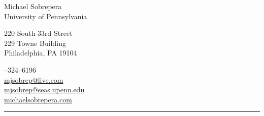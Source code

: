 \begin{center}
    {\LARGE Michael Sobrepera}\\[.5cm]
    University of Pennsylvania\\
    \begin{minipage}[c]{.35\textwidth}
    220 South 33rd Street\\
    229 Towne Building\\
    Philadelphia, PA 19104\\[.2cm]
    \end{minipage}
    \hspace{.28\textwidth}
    \begin{minipage}[r]{.35\textwidth}
    --324--6196\\
    \href{mailto:mjsobrep@live.com}{mjsobrep@live.com}\\
    \href{mailto:mjsobrep@seas.upenn.edu}{mjsobrep@seas.upenn.edu}\\
    \href{https://michaelsobrepera.com}{michaelsobrepera.com}\\
    \end{minipage}
    \end{center}
    \hrule
    \vspace{.4cm}
